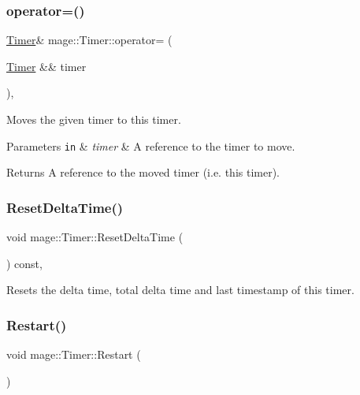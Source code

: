 \subsubsection{\texorpdfstring{operator=()}{operator=()}\hspace{0.1cm}{\footnotesize\ttfamily [2/2]}}
{\footnotesize\ttfamily \hyperlink{classmage_1_1_timer}{Timer}\& mage\+::\+Timer\+::operator= (\begin{DoxyParamCaption}\item[{\hyperlink{classmage_1_1_timer}{Timer} \&\&}]{timer }\end{DoxyParamCaption})\hspace{0.3cm}{\ttfamily [default]}, {\ttfamily [noexcept]}}

Moves the given timer to this timer.


\begin{DoxyParams}[1]{Parameters}
\mbox{\tt in}  & {\em timer} & A reference to the timer to move. \\
\hline
\end{DoxyParams}
\begin{DoxyReturn}{Returns}
A reference to the moved timer (i.\+e. this timer). 
\end{DoxyReturn}
\hypertarget{classmage_1_1_timer_a5b66b3bfbed7cd4a3ad565abec5c3b02}{}\label{classmage_1_1_timer_a5b66b3bfbed7cd4a3ad565abec5c3b02} 
\subsubsection{\texorpdfstring{Reset\+Delta\+Time()}{ResetDeltaTime()}}
{\footnotesize\ttfamily void mage\+::\+Timer\+::\+Reset\+Delta\+Time (\begin{DoxyParamCaption}{ }\end{DoxyParamCaption}) const\hspace{0.3cm}{\ttfamily [private]}, {\ttfamily [noexcept]}}

Resets the delta time, total delta time and last timestamp of this timer. \hypertarget{classmage_1_1_timer_a47e6893e733911624ebf54d5f88cd3fd}{}\label{classmage_1_1_timer_a47e6893e733911624ebf54d5f88cd3fd} 
\subsubsection{\texorpdfstring{Restart()}{Restart()}}
{\footnotesize\ttfamily void mage\+::\+Timer\+::\+Restart (\begin{DoxyParamCaption}{ }\end{DoxyParamCaption})\hspace{0.3cm}{\ttfamily [noexcept]}}

